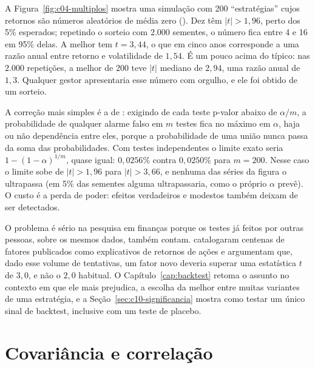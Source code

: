 
A Figura~\ref{fig:c04-multiplos} mostra uma simulação com 200 ``estratégias'' cujos retornos são números aleatórios de média zero (). Dez têm $|t| > 1,96$, perto dos 5\% esperados; repetindo o sorteio com $2.000$ sementes, o número fica entre 4 e 16 em 95\% delas. A melhor tem $t = 3,44$, o que em cinco anos corresponde a uma razão anual entre retorno e volatilidade de $1,54$. É um pouco acima do típico: nas $2.000$ repetições, a melhor de 200 teve $|t|$ mediano de $2,94$, uma razão anual de $1,3$. Qualquer gestor apresentaria esse número com orgulho, e ele foi obtido de um sorteio.

A correção mais simples é a de : exigindo de cada teste p-valor abaixo de $\alpha/m$, a probabilidade de qualquer alarme falso em $m$ testes fica no máximo em $\alpha$, haja ou não dependência entre eles, porque a probabilidade de uma união nunca passa da soma das probabilidades. Com testes independentes o limite exato seria $1-(1-\alpha)^{1/m}$, quase igual: $0,0256\%$ contra $0,0250\%$ para $m = 200$. Nesse caso o limite sobe de $|t| > 1,96$ para $|t| > 3,66$, e nenhuma das séries da figura o ultrapassa (em 5\% das sementes alguma ultrapassaria, como o próprio $\alpha$ prevê). O custo é a perda de poder: efeitos verdadeiros e modestos também deixam de ser detectados.

O problema é sério na pesquisa em finanças porque os testes já feitos por outras pessoas, sobre os mesmos dados, também contam. \citet{harvey2016} catalogaram centenas de fatores publicados como explicativos de retornos de ações e argumentam que, dado esse volume de tentativas, um fator novo deveria superar uma estatística $t$ de $3,0$, e não o $2,0$ habitual. O Capítulo~\ref{cap:backtest} retoma o assunto no contexto em que ele mais prejudica, a escolha da melhor entre muitas variantes de uma estratégia, e a Seção~\ref{sec:c10-significancia} mostra como testar um único sinal de backtest, inclusive com um teste de placebo.

\section{Covariância e correlação}
\label{sec:c04-corr}

